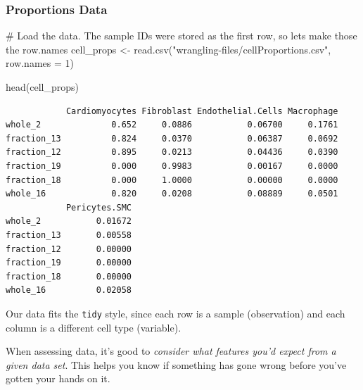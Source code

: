\documentclass[
  letterpaper,
  DIV=11,
  numbers=noendperiod]{scrreprt}
\newenvironment{Shaded}{\begin{snugshade}}{\end{snugshade}}
\newcommand{\AttributeTok}[1]{\textcolor[rgb]{0.40,0.45,0.13}{#1}}
\newcommand{\CommentTok}[1]{\textcolor[rgb]{0.37,0.37,0.37}{#1}}
\newcommand{\DecValTok}[1]{\textcolor[rgb]{0.68,0.00,0.00}{#1}}
\newcommand{\FunctionTok}[1]{\textcolor[rgb]{0.28,0.35,0.67}{#1}}
\newcommand{\NormalTok}[1]{\textcolor[rgb]{0.00,0.23,0.31}{#1}}
\newcommand{\OtherTok}[1]{\textcolor[rgb]{0.00,0.23,0.31}{#1}}
\newcommand{\StringTok}[1]{\textcolor[rgb]{0.13,0.47,0.30}{#1}}
\begin{document}
\subsubsection{Proportions Data}\label{proportions-data}

\begin{Shaded}
\begin{Highlighting}[]
\CommentTok{\# Load the data. The sample IDs were stored as the first row, so lets make those the row.names}
\NormalTok{cell\_props }\OtherTok{\textless{}{-}} \FunctionTok{read.csv}\NormalTok{(}\StringTok{"wrangling{-}files/cellProportions.csv"}\NormalTok{,}
                       \AttributeTok{row.names =} \DecValTok{1}\NormalTok{)}

\FunctionTok{head}\NormalTok{(cell\_props)}
\end{Highlighting}
\end{Shaded}

\begin{verbatim}
            Cardiomyocytes Fibroblast Endothelial.Cells Macrophage
whole_2              0.652     0.0886           0.06700     0.1761
fraction_13          0.824     0.0370           0.06387     0.0692
fraction_12          0.895     0.0213           0.04436     0.0390
fraction_19          0.000     0.9983           0.00167     0.0000
fraction_18          0.000     1.0000           0.00000     0.0000
whole_16             0.820     0.0208           0.08889     0.0501
            Pericytes.SMC
whole_2           0.01672
fraction_13       0.00558
fraction_12       0.00000
fraction_19       0.00000
fraction_18       0.00000
whole_16          0.02058
\end{verbatim}

\begin{tcolorbox}[enhanced jigsaw, bottomtitle=1mm, bottomrule=.15mm, toprule=.15mm, opacityback=0, leftrule=.75mm, breakable, colback=white, toptitle=1mm, left=2mm, coltitle=black, titlerule=0mm, opacitybacktitle=0.6, title=\textcolor{quarto-callout-tip-color}{\faLightbulb}\hspace{0.5em}{Tip}, rightrule=.15mm, arc=.35mm, colframe=quarto-callout-tip-color-frame, colbacktitle=quarto-callout-tip-color!10!white]

Our data fits the \texttt{tidy} style, since each row is a sample
(observation) and each column is a different cell type (variable).

\end{tcolorbox}

When assessing data, it's good to \emph{consider what features you'd
expect from a given data set}. This helps you know if something has gone
wrong before you've gotten your hands on it.
\end{document}
